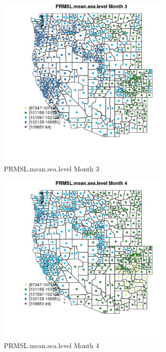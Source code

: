 \begin{figure} 
\centering  
\includegraphics[width=0.77\textwidth]{Code_Outputs/df_report_ML_predictors_CountyCentroid_Locations_Dates_2008-01-01to2018-12-31_MapObsMo3PRMSLmeansealevel.jpg} 
\caption{\label{fig:df_report_ML_predictors_CountyCentroid_Locations_Dates_2008-01-01to2018-12-31MapObsMo3PRMSLmeansealevel}PRMSL.mean.sea.level Month 3} 
\end{figure} 
 

\begin{figure} 
\centering  
\includegraphics[width=0.77\textwidth]{Code_Outputs/df_report_ML_predictors_CountyCentroid_Locations_Dates_2008-01-01to2018-12-31_MapObsMo4PRMSLmeansealevel.jpg} 
\caption{\label{fig:df_report_ML_predictors_CountyCentroid_Locations_Dates_2008-01-01to2018-12-31MapObsMo4PRMSLmeansealevel}PRMSL.mean.sea.level Month 4} 
\end{figure} 
 

